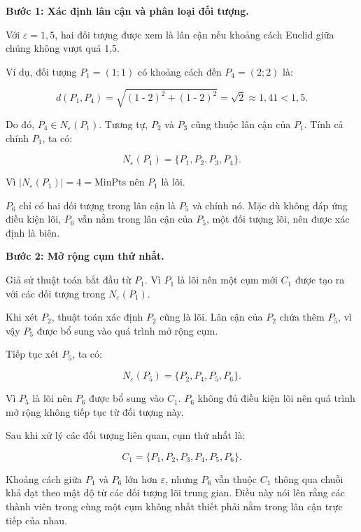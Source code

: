 \textbf{Bước 1: Xác định lân cận và phân loại đối tượng.}

Với \(\varepsilon=1{,}5\), hai đối tượng được xem là lân cận nếu khoảng cách Euclid giữa chúng không vượt quá 1,5.

Ví dụ, đối tượng \(P_1=(1;1)\) có khoảng cách đến \(P_4=(2;2)\) là:

\begin{equation}
    d(P_1,P_4)=\sqrt{(1\;\text{-}\;2)^2+(1\;\text{-}\;2)^2}
    =\sqrt{2}\approx 1{,}41 < 1{,}5.
\end{equation}

Do đó, \(P_4\in N_{\varepsilon}(P_1)\). Tương tự, \(P_2\) và \(P_3\) cũng thuộc lân cận của \(P_1\). Tính cả chính \(P_1\), ta có:

\begin{equation}
    N_{\varepsilon}(P_1)=\{P_1,P_2,P_3,P_4\}.
\end{equation}

Vì \(|N_{\varepsilon}(P_1)|=4=\mathrm{MinPts}\) nên \(P_1\) là lõi.

\(P_6\) chỉ có hai đối tượng trong lân cận là \(P_5\) và chính nó. Mặc dù không đáp ứng điều kiện lõi, \(P_6\) vẫn nằm trong lân cận của \(P_5\), một đối tượng lõi, nên được xác định là biên.

\textbf{Bước 2: Mở rộng cụm thứ nhất.}

Giả sử thuật toán bắt đầu từ \(P_1\). Vì \(P_1\) là lõi nên một cụm mới \(C_1\) được tạo ra với các đối tượng trong \(N_{\varepsilon}(P_1)\).

Khi xét \(P_2\), thuật toán xác định \(P_2\) cũng là lõi. Lân cận của \(P_2\) chứa thêm \(P_5\), vì vậy \(P_5\) được bổ sung vào quá trình mở rộng cụm.

Tiếp tục xét \(P_5\), ta có:

\begin{equation}
    N_{\varepsilon}(P_5)=\{P_2,P_4,P_5,P_6\}.
\end{equation}

Vì \(P_5\) là lõi nên \(P_6\) được bổ sung vào \(C_1\). \(P_6\) không đủ điều kiện lõi nên quá trình mở rộng không tiếp tục từ đối tượng này.

Sau khi xử lý các đối tượng liên quan, cụm thứ nhất là:

\begin{equation}
    C_1=\{P_1,P_2,P_3,P_4,P_5,P_6\}.
\end{equation}

Khoảng cách giữa \(P_1\) và \(P_6\) lớn hơn \(\varepsilon\), nhưng \(P_6\) vẫn thuộc \(C_1\) thông qua chuỗi khả đạt theo mật độ từ các đối tượng lõi trung gian. Điều này nói lên rằng các thành viên trong cùng một cụm không nhất thiết phải nằm trong lân cận trực tiếp của nhau.

